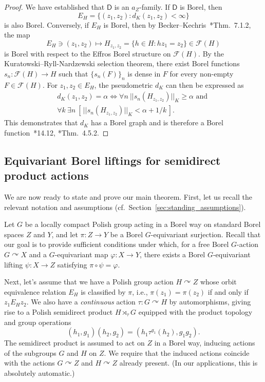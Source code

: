 \documentclass[12pt]{paper}
\numberwithin{equation}{section}
\theoremstyle{plain}
\theoremstyle{definition}
\newcommand{\effros}[1]{\mathcal{F}(#1)}
\newcommand{\unifm}{\mathsf{D}}
\newcommand{\acts}{\curvearrowright}
\newcommand{\norm}[1]{||#1||}
\renewcommand{\phi}{\varphi}
\begin{document}
\begin{proof}
  We have established that \(\unifm\) is an \(a_{Z}\)-family.  If \(\unifm\) is Borel, then
  \[E_{H} = \{(z_{1},z_{2}) : d_{K}(z_{1}, z_{2}) < \infty\}\]
  is also Borel.  Conversely, if \(E_{H}\) is Borel, then by
  Becker--Kechris~\cite{beckerDescriptiveSetTheory1996}*{Thm.~7.1.2}, the map
  \[E_{H} \ni (z_{1},z_{2}) \mapsto H_{z_{1},z_{2}} = \{h \in H : hz_{1} = z_{2}\} \in \effros{H}\]
  is Borel with respect to the Effros Borel structure on \(\effros{H}\).  By the
  Kuratowski--Ryll-Nardzewski selection theorem, there exist Borel functions
  \(s_{n} : \effros{H} \to H\) such that \(\{s_{n}(F)\}_{n}\) is dense in \(F\) for every non-empty
  \(F \in \effros{H}\). For \(z_{1}, z_{2} \in E_{H}\), the pseudometric \(d_{K}\) can then be
  expressed as
  \begin{multline*}
    d_{K}(z_{1},z_{2}) = \alpha \iff \forall n\ \norm{s_{n}(H_{z_{1},z_{2}})}_{K} \ge \alpha
    \textrm{ and }\\ \forall k\ \exists n\ [\, \norm{s_{n}(H_{z_{1},z_{2}})}_{K} < \alpha + 1/k\,].
  \end{multline*}
  This demonstrates that \(d_{K}\) has a Borel graph and is therefore a Borel
  function~\cite{Kechris}*{14.12}, \cite{MR1619545}*{Thm.~4.5.2}.
\end{proof}


\subsection{Equivariant Borel liftings for semidirect product actions}
\label{sec:equivariant-borel-liftings-semiproduct}
We are now ready to state and prove our main theorem. First, let us recall the relevant notation and
assumptions (cf.\ Section~\ref{sec:standing_assumptions}).

Let \(G\) be a locally compact Polish group acting in a Borel way on standard Borel spaces \(Z\) and
\(Y\), and let \(\pi:Z\to Y\) be a Borel \(G\)-equivariant surjection. Recall that our goal is to
provide sufficient conditions under which, for a free Borel \(G\)-action \(G\acts X\) and a
\(G\)-equivariant map \(\phi:X\to Y\), there exists a Borel \(G\)-equivariant lifting
\(\psi:X\to Z\) satisfying \(\pi\circ \psi=\phi\).

Next, let's assume that we have a Polish group action \(H\acts Z\) whose orbit equivalence relation
\(E_H\) is classified by \(\pi\), i.e., \(\pi(z_{1}) = \pi(z_{2})\) if and only if
\(z_{1}E_{H}z_{2}\). We also have a \emph{continuous} action \(\tau : G \acts H\) by automorphisms,
giving rise to a Polish semidirect product \(H \rtimes_{\tau} G\) equipped with the product topology
and group operations
\[
(h_{1},g_{1})(h_{2},g_{2}) = (h_{1}\tau^{g_{1}}(h_{2}), g_{1}g_{2}).
\]
The semidirect product is assumed to act on \(Z\) in a Borel way, inducing actions of the subgroups
\(G\) and \(H\) on \(Z\).  We require that the induced actions coincide with the actions
\(G\acts Z\) and \(H\acts Z\) already present.  (In our applications, this is absolutely automatic.)
\end{document}
